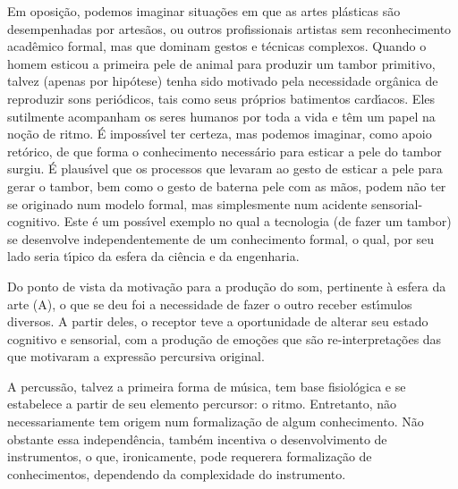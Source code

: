 \documentclass[
12pt,		%
openright,	%
twoside,  %
a4paper,			%
chapter=TITLE,		%
english,			%
french,				%
spanish,			%
brazil				%
]{USPSC-classe/USPSC}
\begin{document}
Em oposi\c{c}\~ao, podemos imaginar situa\c{c}\~oes em que as artes pl\'asticas s\~ao desempenhadas por artes\~aos, ou outros profissionais artistas sem reconhecimento acad\^emico formal, mas que dominam gestos e t\'ecnicas complexos. Quando o homem esticou a primeira pele de animal para produzir um tambor primitivo, talvez (apenas por hip\'otese) tenha sido motivado pela necessidade org\^anica de reproduzir sons peri\'odicos, tais como seus pr\'oprios batimentos card\'{\i}acos. Eles sutilmente acompanham os seres humanos por toda a vida e t\^em um papel na no\c{c}\~ao de ritmo. \'E imposs\'{\i}vel ter certeza, mas podemos imaginar, como apoio ret\'orico, de que forma o conhecimento necess\'ario para esticar a pele do tambor surgiu. \'E plaus\'{\i}vel que os processos que levaram ao gesto de esticar a pele para gerar o tambor, bem como o gesto de \textquotedbl bater\textquotedbl  na pele com as m\~aos, podem n\~ao ter se originado num modelo formal, mas simplesmente num acidente sensorial-cognitivo. Este \'e um poss\'{\i}vel exemplo no qual a tecnologia (de fazer um tambor) se desenvolve independentemente de um conhecimento formal, o qual, por seu lado seria t\'{\i}pico da esfera da ci\^encia e da engenharia.

















Do ponto de vista da motiva\c{c}\~ao para a produ\c{c}\~ao do som, pertinente \`a esfera da arte (A), o que se deu foi a necessidade de fazer o outro receber est\'{\i}mulos diversos. A partir deles, o receptor teve a oportunidade de alterar seu estado cognitivo e sensorial, com a produ\c{c}\~ao de emo\c{c}\~oes que s\~ao re-interpreta\c{c}\~oes das que motivaram a express\~ao percursiva original.

















A percuss\~ao, talvez a primeira forma de m\'usica, tem base fisiol\'ogica e se estabelece a partir de seu elemento percursor: o ritmo. Entretanto, n\~ao necessariamente tem origem num formaliza\c{c}\~ao de algum conhecimento. N\~ao obstante essa independ\^encia, tamb\'em incentiva o desenvolvimento de instrumentos, o que, ironicamente, pode requerera formaliza\c{c}\~ao de conhecimentos, dependendo da complexidade do instrumento.
\end{document}
